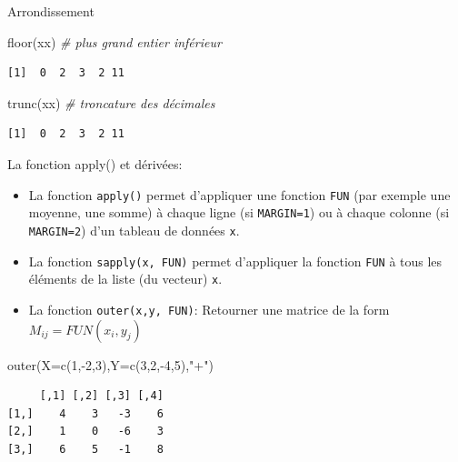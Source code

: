 \documentclass[
  8pt,
  ignorenonframetext,
]{beamer}
\newenvironment{Shaded}{\begin{snugshade}}{\end{snugshade}}
\newcommand{\AttributeTok}[1]{\textcolor[rgb]{0.77,0.63,0.00}{#1}}
\newcommand{\CommentTok}[1]{\textcolor[rgb]{0.56,0.35,0.01}{\textit{#1}}}
\newcommand{\DecValTok}[1]{\textcolor[rgb]{0.00,0.00,0.81}{#1}}
\newcommand{\FunctionTok}[1]{\textcolor[rgb]{0.00,0.00,0.00}{#1}}
\newcommand{\NormalTok}[1]{#1}
\newcommand{\SpecialCharTok}[1]{\textcolor[rgb]{0.00,0.00,0.00}{#1}}
\newcommand{\StringTok}[1]{\textcolor[rgb]{0.31,0.60,0.02}{#1}}
\begin{document}
\begin{frame}[fragile]{Arrondissement}
\begin{Shaded}
\begin{Highlighting}[]
\FunctionTok{floor}\NormalTok{(xx)     }\CommentTok{\# plus grand entier inférieur}
\end{Highlighting}
\end{Shaded}

\begin{verbatim}
[1]  0  2  3  2 11
\end{verbatim}

\begin{Shaded}
\begin{Highlighting}[]
\FunctionTok{trunc}\NormalTok{(xx)     }\CommentTok{\# troncature des décimales}
\end{Highlighting}
\end{Shaded}

\begin{verbatim}
[1]  0  2  3  2 11
\end{verbatim}
\end{frame}

\begin{frame}[fragile]{La fonction apply() et dérivées:}
\protect\hypertarget{la-fonction-apply-et-duxe9rivuxe9es}{}
\begin{itemize}
\item
  La fonction \texttt{apply()} permet d'appliquer une fonction
  \texttt{FUN} (par exemple une moyenne, une somme) à chaque ligne (si
  \texttt{MARGIN=1}) ou à chaque colonne (si \texttt{MARGIN=2}) d'un
  tableau de données \texttt{x}.\pause
\item
  La fonction \texttt{sapply(x,\ FUN)} permet d'appliquer la fonction
  \texttt{FUN} à tous les éléments de la liste (du vecteur) \texttt{x}.
\item
  La fonction \texttt{outer(x,y,\ FUN)}: Retourner une matrice de la
  form \(M_{ij}=FUN(x_i,y_j)\)
\end{itemize}

\begin{Shaded}
\begin{Highlighting}[]
\FunctionTok{outer}\NormalTok{(}\AttributeTok{X=}\FunctionTok{c}\NormalTok{(}\DecValTok{1}\NormalTok{,}\SpecialCharTok{{-}}\DecValTok{2}\NormalTok{,}\DecValTok{3}\NormalTok{),}\AttributeTok{Y=}\FunctionTok{c}\NormalTok{(}\DecValTok{3}\NormalTok{,}\DecValTok{2}\NormalTok{,}\SpecialCharTok{{-}}\DecValTok{4}\NormalTok{,}\DecValTok{5}\NormalTok{),}\StringTok{"+"}\NormalTok{)}
\end{Highlighting}
\end{Shaded}

\begin{verbatim}
     [,1] [,2] [,3] [,4]
[1,]    4    3   -3    6
[2,]    1    0   -6    3
[3,]    6    5   -1    8
\end{verbatim}
\end{frame}
\end{document}
